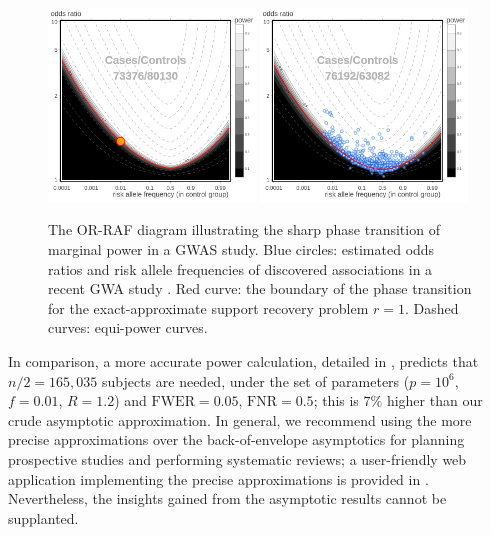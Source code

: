 \begin{figure}
      \centering
      \includegraphics[width=0.49\textwidth]{./newplot.png} %
      \includegraphics[width=0.49\textwidth]{./OR-RAF_BC_study.png}
      \caption{ The OR-RAF diagram illustrating the sharp phase transition of marginal power in a GWAS study. 
      Blue circles: estimated odds ratios and risk allele frequencies of discovered associations in a recent GWA study \cite{michailidou2017association}.
      Red curve: the boundary of the phase transition for the exact-approximate support recovery problem $r=1$.
      Dashed curves: equi-power curves.} 
      \label{fig:OR-RAF_GWAS}
\end{figure}


In comparison, a more accurate power calculation, detailed in \cite{gao2019upass}, predicts that $n / 2 = 165,035$ subjects are needed, under the set of parameters ($p=10^6$, $f=0.01$, $R=1.2$) and $\mathrm{FWER}=0.05$, $\mathrm{FNR}=0.5$; this is $7\%$ higher than our crude asymptotic approximation.
In general, we recommend using the more precise approximations over the back-of-envelope asymptotics for planning prospective studies and performing systematic reviews;
a user-friendly web application implementing the precise approximations is provided in \cite{gao2019upass}.
Nevertheless, the insights gained from the asymptotic results cannot be supplanted.
